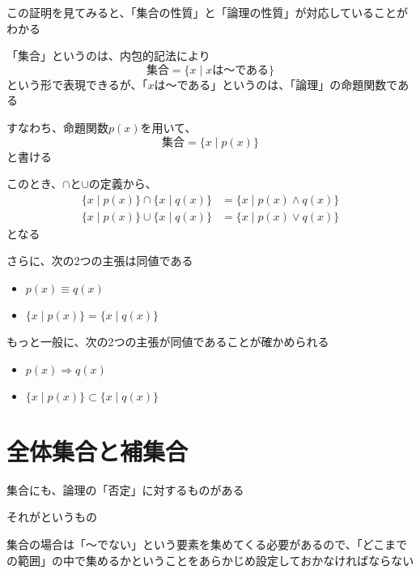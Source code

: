 \documentclass[b5paper,12pt]{jsarticle}
\begin{document}
この証明を見てみると、「集合の性質」と「論理の性質」が対応していることがわかる

\sectionline

「集合」というのは、内包的記法により
\begin{equation*}
  \text{集合} = \{x \mid x \text{は〜である}\}
\end{equation*}
という形で表現できるが、「$x$は〜である」というのは、「論理」の命題関数である

\br

すなわち、命題関数$p(x)$を用いて、
\begin{equation*}
  \text{集合} = \{x \mid p(x)\}
\end{equation*}
と書ける

\br

このとき、$\cap$と$\cup$の定義から、
\begin{align*}
  \{x \mid p(x)\} \cap \{x \mid q(x)\} & = \{x \mid p(x) \land q(x)\} \\
  \{x \mid p(x)\} \cup \{x \mid q(x)\} & = \{x \mid p(x) \lor q(x)\}
\end{align*}
となる

\br

さらに、次の2つの主張は同値である
\begin{itemize}
  \item $p(x) \equiv q(x)$
  \item $\{x \mid p(x)\} = \{x \mid q(x)\}$
\end{itemize}

\br

もっと一般に、次の2つの主張が同値であることが確かめられる
\begin{itemize}
  \item $p(x) \Rightarrow q(x)$
  \item $\{x \mid p(x)\} \subset \{x \mid q(x)\}$
\end{itemize}

\sectionline
\section{全体集合と補集合}

集合にも、論理の「否定」に対するものがある

それがというもの

\br

集合の場合は「〜でない」という要素を集めてくる必要があるので、「どこまでの範囲」の中で集めるかということをあらかじめ設定しておかなければならない
\end{document}
